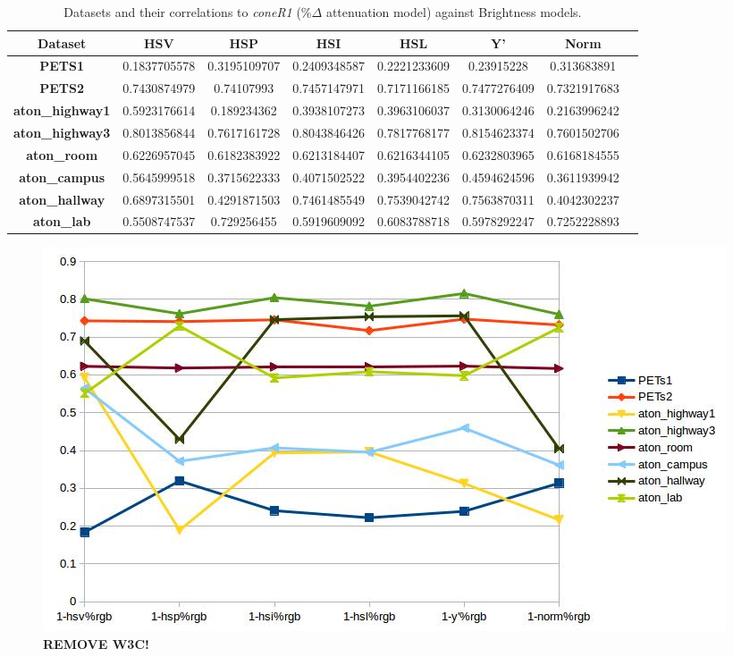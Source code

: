 \documentclass[12pt]{report}
\begin{document}
\begin{table}
\begin{tabular}{ |c|c|c|c|c|c|c|c| }
	\hline
	\textbf{Dataset} & \textbf{HSV} & \textbf{HSP} & \textbf{HSI} & \textbf{HSL}& \textbf{Y'} & \textbf{Norm} \\
	\hline
	\hline
	\textbf{PETS1} & 0.1837705578 & 0.3195109707 & 0.2409348587 & 0.2221233609 & 0.23915228 & 0.313683891 \\
	\hline
	\textbf{PETS2} & 0.7430874979 & 0.74107993 & 0.7457147971 & 0.7171166185 & 0.7477276409 & 0.7321917683 \\
	\hline
	\textbf{aton\_highway1} & 0.5923176614 & 0.189234362 & 0.3938107273 & 0.3963106037 & 0.3130064246 & 0.2163996242 \\
	\hline
	\textbf{aton\_highway3} & 0.8013856844 & 0.7617161728 & 0.8043846426 & 0.7817768177 & 0.8154623374 & 0.7601502706 \\
	\hline
	\textbf{aton\_room} & 0.6226957045 & 0.6182383922 & 0.6213184407 & 0.6216344105 & 0.6232803965 & 0.6168184555 \\
	\hline
	\textbf{aton\_campus} & 0.5645999518 & 0.3715622333 & 0.4071502522 & 0.3954402236 & 0.4594624596 & 0.3611939942 \\
	\hline
	\textbf{aton\_hallway} & 0.6897315501 & 0.4291871503 & 0.7461485549 & 0.7539042742 & 0.7563870311 & 0.4042302237 \\
	\hline
	\textbf{aton\_lab} & 0.5508747537 & 0.729256455 & 0.5919609092 & 0.6083788718 & 0.5978292247 & 0.7252228893 \\
	\hline
\end{tabular}
\caption{Datasets and their correlations to \textit{coneR1} (\%$\Delta$ attenuation model) against Brightness models.}
\label{table:brightness_corr_rgb}
\end{table}

\begin{figure}
  \includegraphics[width=\linewidth]{figures/brightness/rgb/correlation_x.jpg}
  \caption{\textbf{REMOVE W3C!}}
\label{fig:brightness_corr_rgb}
\end{figure}
\end{document}
